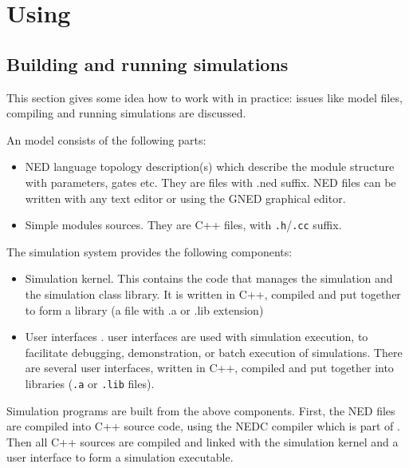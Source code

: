 \section{Using {\opp}}


\subsection{Building and running simulations}

This section gives some idea how to work with {\opp} in practice: 
issues like model files, compiling and running simulations are 
discussed.

An {\opp} model consists of the following parts:
\begin{itemize}
  \item{NED language topology description(s) which
    describe the module structure with parameters, gates etc. They are
    files with .ned suffix. NED files can be written with any text
    editor or using the GNED graphical editor.}
  \item{ Simple modules sources. They are C++ files, with \texttt{.h}/\texttt{.cc} suffix.}
\end{itemize}

The simulation system provides the following components:
\begin{itemize}
  \item{Simulation kernel. This contains the
    code that manages the simulation and the simulation class library.
    It is written in C++, compiled and put together to form a library
    (a file with .a or .lib extension)}
  \item{User interfaces
    . {\opp} user interfaces
    are used with simulation execution, to facilitate debugging,
    demonstration, or batch execution of simulations. There are
    several user interfaces, written in C++, compiled and put together
    into libraries (\texttt{.a} or \texttt{.lib} files).}
\end{itemize}


Simulation programs are built from the above components. First, the
NED files are compiled into C++ source code, using
the NEDC compiler which is part of {\opp}. Then
all C++ sources are compiled and linked with the simulation kernel and
a user interface to form a simulation executable.


